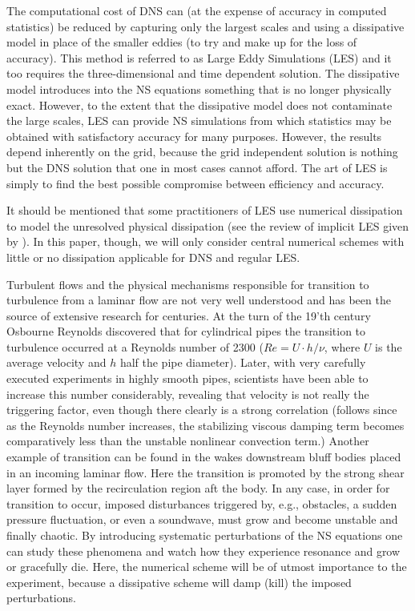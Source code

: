 The computational cost of DNS can (at the expense of accuracy in
computed statistics) be reduced by capturing only the largest scales
and using a dissipative model in place of the smaller eddies (to try
and make up for the loss of accuracy). This method is referred to as
Large Eddy Simulations (LES) and it too requires the three-dimensional
and time dependent solution. The dissipative model introduces into the
NS equations something that is no longer physically exact. However, to
the extent that the dissipative model does not contaminate the large
scales, LES can provide NS simulations from which statistics may be
obtained with satisfactory accuracy for many purposes. However, the
results depend inherently on the grid, because the grid independent
solution is nothing but the DNS solution that one in most cases cannot
afford. The art of LES is simply to find the best possible compromise
between efficiency and accuracy.

It should be mentioned that some practitioners of LES use numerical
dissipation to model the unresolved physical dissipation (see the 
review of implicit LES given by \citet{Iles}). In this paper, though,
we will only consider central numerical schemes with little or no
dissipation applicable for DNS and regular LES.


Turbulent flows and the physical mechanisms responsible for transition
to turbulence from a laminar flow are not very well understood and has
been the source of extensive research for centuries. At the turn of
the 19'th century Osbourne Reynolds discovered that for cylindrical
pipes the transition to turbulence occurred at a Reynolds number of
2300 ($Re=U\cdot h/\nu$, where $U$ is the average velocity and $h$
half the pipe diameter). Later, with very carefully executed
experiments in highly smooth pipes, scientists have been able to
increase this number considerably, revealing that velocity is not
really the triggering factor, even though there clearly is a strong
correlation (follows since as the Reynolds number increases, the
stabilizing viscous damping term becomes comparatively less than the
unstable nonlinear convection term.) Another example of transition can
be found in the wakes downstream bluff bodies placed in an incoming
laminar flow. Here the transition is promoted by the strong shear
layer formed by the recirculation region aft the body. In any case, in
order for transition to occur, imposed disturbances triggered by,
e.g., obstacles, a sudden pressure fluctuation, or even a soundwave,
must grow and become unstable and finally chaotic. By introducing
systematic perturbations of the NS equations one can study these
phenomena and watch how they experience resonance and grow or
gracefully die. Here, the numerical scheme will be of utmost
importance to the experiment, because a dissipative scheme will damp
(kill) the imposed perturbations.

